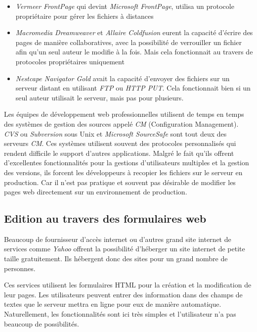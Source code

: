 \documentclass[a4paper, 11pt]{article}
\begin{document}
{		\begin{itemize}
			\item \emph{Vermeer FrontPage} qui devint \emph{Microsoft FrontPage}, utilisa un protocole propriétaire pour gérer les fichiers à distances	
			\item 		\emph{Macromedia Dreamweaver} et \emph{Allaire Coldfusion} eurent la capacité d'écrire des pages de manière collaboratives, avec la possibilité de verrouiller un fichier afin qu'un seul auteur le modifie à la fois. Mais cela fonctionnait au travers de protocoles propriétaires uniquement
			\item 		\emph{Nestcape Navigator Gold} avait la capacité d'envoyer des fichiers sur un serveur distant en utilisant \emph{FTP} ou \emph{HTTP PUT}. Cela fonctionnait bien si un seul auteur utilisait le serveur, mais pas pour plusieurs.
		\end{itemize}
		
		Les équipes de développement web professionnelles utilisent de temps en temps des systèmes de gestion des sources appelé \emph{CM} (Configuration Management). \emph{CVS} ou \emph{Subversion} sous Unix et \emph{Microsoft SourceSafe} sont tout deux des serveurs \emph{CM}. Ces systèmes utilisent souvent des protocoles personnalisés qui rendent difficile le support d'autres applications. Malgré le fait qu'ils offrent d'excellentes fonctionnalités pour la gestions d'utilisateurs multiples et la gestion des versions, ils forcent les développeurs à recopier les fichiers sur le serveur en production. Car il n'est pas pratique et souvent pas désirable de modifier les pages web directement sur un environnement de production.
	
	\subsection{Edition au travers des formulaires web}
	
		Beaucoup de fournisseur d'accès internet ou d'autres grand site internet de services comme \emph{Yahoo} offrent la possibilité d'héberger un site internet de petite taille gratuitement. Ils hébergent donc des sites pour un grand nombre de personnes. 
		
		Ces services utilisent les formulaires HTML pour la création et la modification de leur pages. Les utilisateurs peuvent entrer des information dans des champs de textes que le serveur mettra en ligne pour eux de manière automatique. Naturellement, les fonctionnalités sont ici très simples et l'utilisateur n'a pas beaucoup de possibilités. 
		
}
\end{document}

